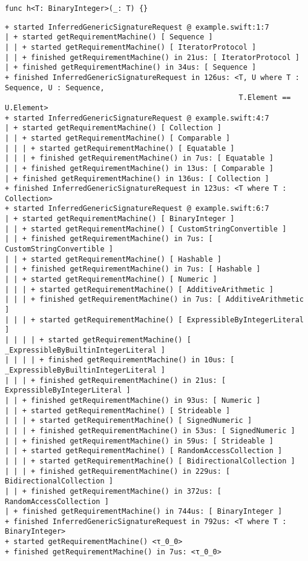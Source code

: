 \documentclass[../generics]{subfiles}
\begin{document}
\begin{listing}
\begin{Verbatim}
func h<T: BinaryInteger>(_: T) {}
\end{Verbatim}
\begin{Verbatim}[fontsize=\scriptsize,numbers=none]
+ started InferredGenericSignatureRequest @ example.swift:1:7
| + started getRequirementMachine() [ Sequence ]
| | + started getRequirementMachine() [ IteratorProtocol ]
| | + finished getRequirementMachine() in 21us: [ IteratorProtocol ]
| + finished getRequirementMachine() in 34us: [ Sequence ]
+ finished InferredGenericSignatureRequest in 126us: <T, U where T : Sequence, U : Sequence,
                                                      T.Element == U.Element>
+ started InferredGenericSignatureRequest @ example.swift:4:7
| + started getRequirementMachine() [ Collection ]
| | + started getRequirementMachine() [ Comparable ]
| | | + started getRequirementMachine() [ Equatable ]
| | | + finished getRequirementMachine() in 7us: [ Equatable ]
| | + finished getRequirementMachine() in 13us: [ Comparable ]
| + finished getRequirementMachine() in 136us: [ Collection ]
+ finished InferredGenericSignatureRequest in 123us: <T where T : Collection>
+ started InferredGenericSignatureRequest @ example.swift:6:7
| + started getRequirementMachine() [ BinaryInteger ]
| | + started getRequirementMachine() [ CustomStringConvertible ]
| | + finished getRequirementMachine() in 7us: [ CustomStringConvertible ]
| | + started getRequirementMachine() [ Hashable ]
| | + finished getRequirementMachine() in 7us: [ Hashable ]
| | + started getRequirementMachine() [ Numeric ]
| | | + started getRequirementMachine() [ AdditiveArithmetic ]
| | | + finished getRequirementMachine() in 7us: [ AdditiveArithmetic ]
| | | + started getRequirementMachine() [ ExpressibleByIntegerLiteral ]
| | | | + started getRequirementMachine() [ _ExpressibleByBuiltinIntegerLiteral ]
| | | | + finished getRequirementMachine() in 10us: [ _ExpressibleByBuiltinIntegerLiteral ]
| | | + finished getRequirementMachine() in 21us: [ ExpressibleByIntegerLiteral ]
| | + finished getRequirementMachine() in 93us: [ Numeric ]
| | + started getRequirementMachine() [ Strideable ]
| | | + started getRequirementMachine() [ SignedNumeric ]
| | | + finished getRequirementMachine() in 53us: [ SignedNumeric ]
| | + finished getRequirementMachine() in 59us: [ Strideable ]
| | + started getRequirementMachine() [ RandomAccessCollection ]
| | | + started getRequirementMachine() [ BidirectionalCollection ]
| | | + finished getRequirementMachine() in 229us: [ BidirectionalCollection ]
| | + finished getRequirementMachine() in 372us: [ RandomAccessCollection ]
| + finished getRequirementMachine() in 744us: [ BinaryInteger ]
+ finished InferredGenericSignatureRequest in 792us: <T where T : BinaryInteger>
+ started getRequirementMachine() <τ_0_0>
+ finished getRequirementMachine() in 7us: <τ_0_0>
\end{Verbatim}
\end{listing}
\end{document}
